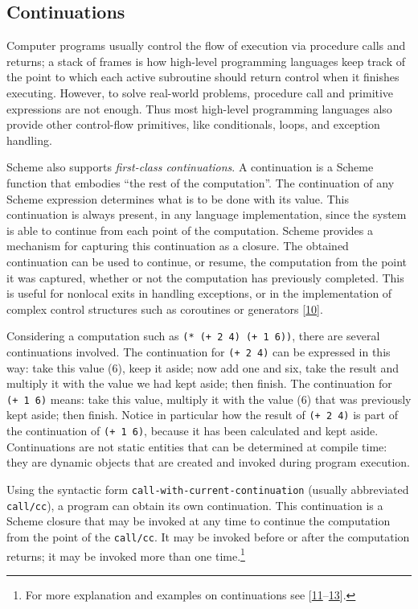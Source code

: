 \documentclass[12pt,a4paper,oneside,openright]{book}
\begin{document}
\subsection{Continuations}\label{continuations}

Computer programs usually control the flow of execution via procedure
calls and returns; a stack of frames is how high-level programming
languages keep track of the point to which each active subroutine should
return control when it finishes executing. However, to solve real-world
problems, procedure call and primitive expressions are not enough. Thus
most high-level programming languages also provide other control-flow
primitives, like conditionals, loops, and exception handling.

Scheme also supports \emph{first-class continuations}. A continuation is
a Scheme function that embodies ``the rest of the computation''. The
continuation of any Scheme expression determines what is to be done with
its value. This continuation is always present, in any language
implementation, since the system is able to continue from each point of
the computation. Scheme provides a mechanism for capturing this
continuation as a closure. The obtained continuation can be used to
continue, or resume, the computation from the point it was captured,
whether or not the computation has previously completed. This is useful
for nonlocal exits in handling exceptions, or in the implementation of
complex control structures such as coroutines or generators
{[}\hyperref[ref-dybvig1987three]{10}{]}.

Considering a computation such as \texttt{(*\ (+\ 2\ 4)\ (+\ 1\ 6))},
there are several continuations involved. The continuation for
\texttt{(+\ 2\ 4)} can be expressed in this way: take this value (6),
keep it aside; now add one and six, take the result and multiply it with
the value we had kept aside; then finish. The continuation for
\texttt{(+\ 1\ 6)} means: take this value, multiply it with the value
(6) that was previously kept aside; then finish. Notice in particular
how the result of \texttt{(+\ 2\ 4)} is part of the continuation of
\texttt{(+\ 1\ 6)}, because it has been calculated and kept aside.
Continuations are not static entities that can be determined at compile
time: they are dynamic objects that are created and invoked during
program execution.

Using the syntactic form \texttt{call-with-current-continuation}
(usually abbreviated \texttt{call/cc}), a program can obtain its own
continuation. This continuation is a Scheme closure that may be invoked
at any time to continue the computation from the point of the
\texttt{call/cc}. It may be invoked before or after the computation
returns; it may be invoked more than one time.\footnote{For more
  explanation and examples on continuations see
  {[}\hyperref[ref-ContByExample2015]{11}--\hyperref[ref-PageCallcc2015]{13}{]}.}
\end{document}
